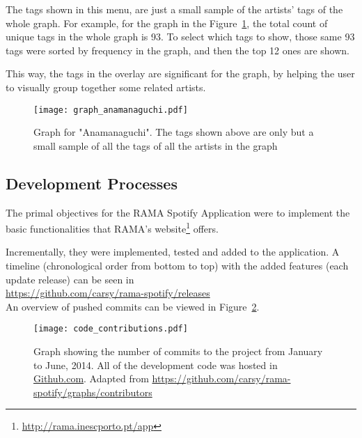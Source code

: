       The tags shown in this menu, are just a small sample of the artists' tags of the whole graph.
      For example, for the graph in the Figure~\ref{fig:graph_anamanaguchi}, the total count of unique tags in the whole graph is 93.
      To select which tags to show, those same 93 tags were sorted by frequency in the graph, and then the top 12 ones are shown.

      This way, the tags in the overlay are significant for the graph, by helping the user to visually group together some related artists.

      \begin{figure}
        \begin{center}
          \texttt{[image: graph\_anamanaguchi.pdf]}
        \end{center}
        \caption{Graph for "Anamanaguchi". The tags shown above are only but a small sample of all the tags of all the artists in the graph}
        \label{fig:graph_anamanaguchi}
      \end{figure}



  \clearpage


  \subsection{Development Processes} %
    \label{sub:development_process}

    The primal objectives for the RAMA Spotify Application were to implement the basic functionalities that RAMA's website\footnote{\url{http://rama.inescporto.pt/app}} offers.

    Incrementally, they were implemented, tested and added to the application.
    A timeline (chronological order from bottom to top) with the added features (each update release) can be seen in \\ 
    \indent \url{https://github.com/carsy/rama-spotify/releases} \\

    An overview of pushed commits can be viewed in Figure~\ref{fig:code_contributions}.

    \begin{figure}[H]
      \begin{center}
        \texttt{[image: code\_contributions.pdf]}
      \end{center}
      \caption{Graph showing the number of commits to the project from January to June, 2014. All of the development code was hosted in \url{Github.com}. Adapted from \url{https://github.com/carsy/rama-spotify/graphs/contributors}}
      \label{fig:code_contributions}
    \end{figure}


